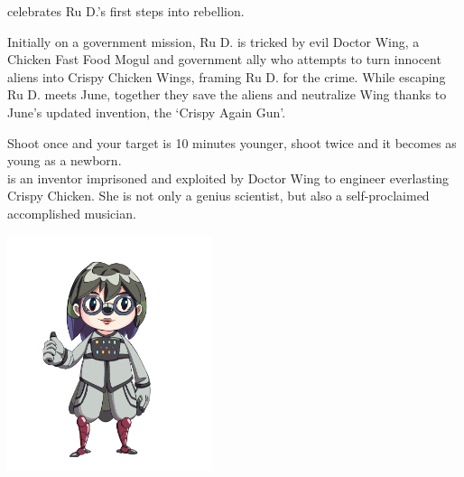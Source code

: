 \clearpage 

 celebrates Ru D.'s first steps into rebellion. 

Initially on a government mission, Ru D. is tricked by evil Doctor Wing, a Chicken Fast Food Mogul and government ally who attempts to turn innocent aliens into Crispy Chicken Wings, framing Ru D. for the crime. While escaping Ru D. meets June, together they save the aliens and neutralize Wing thanks to June's updated invention, the `Crispy Again Gun'.

Shoot once and your target is 10 minutes younger, shoot twice and it becomes as young as a newborn.\\

 is an inventor imprisoned and exploited by Doctor Wing to engineer everlasting Crispy Chicken. She is not only a genius scientist, but also a self-proclaimed accomplished musician.

\begin{center}
\includegraphics[width=0.45\textwidth]{Assets/june}
\end{center}



\clearpage